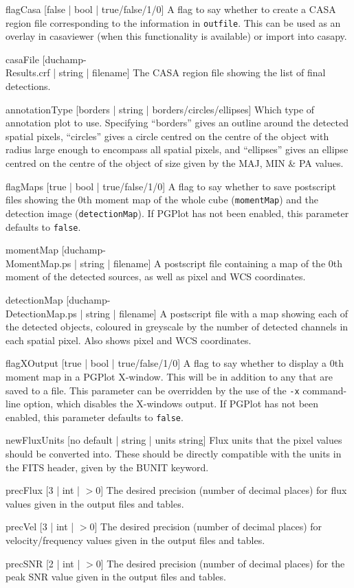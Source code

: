 \begin{Lentry}
\item[{flagCasa [false | bool | true/false/1/0]}] A flag to say
  whether to create a CASA region file corresponding to the
  information in \texttt{outfile}. This can be used as an overlay in
  casaviewer (when this functionality is available) or import into
  casapy.
\item[{casaFile [duchamp-\\Results.crf | string | filename]}] The CASA
  region file showing the list of final detections.
\item[{annotationType [borders | string | borders/circles/ellipses]}]
  Which type of annotation plot to use. Specifying ``borders'' gives
  an outline around the detected spatial pixels, ``circles'' gives a
  circle centred on the centre of the object with radius large enough
  to encompass all spatial pixels, and ``ellipses'' gives an ellipse
  centred on the centre of the object of size given by the MAJ, MIN \&
  PA values.
\item[{flagMaps [true | bool | true/false/1/0]}] A flag to say whether
  to save postscript files showing the 0th moment map of the whole
  cube (\texttt{momentMap}) and the detection image
  (\texttt{detectionMap}). If PGPlot has not been enabled, this
  parameter defaults to \texttt{false}.
\item[{momentMap [duchamp-\\MomentMap.ps | string | filename]}] A
  postscript file containing a map of the 0th moment of the detected
  sources, as well as pixel and WCS coordinates.
\item[{detectionMap [duchamp-\\DetectionMap.ps | string | filename]}]
  A postscript file with a map showing each of the detected objects,
  coloured in greyscale by the number of detected channels in each
  spatial pixel. Also shows pixel and WCS coordinates.
\item[{flagXOutput [true | bool | true/false/1/0]}] A flag to say
  whether to display a 0th moment map in a PGPlot X-window. This will
  be in addition to any that are saved to a file. This parameter can
  be overridden by the use of the \texttt{-x} command-line option,
  which disables the X-windows output. If PGPlot has not been enabled,
  this parameter defaults to \texttt{false}.
\item[{newFluxUnits [no default | string | units string]}] Flux units
  that the pixel values should be converted into. These should be
  directly compatible with the units in the FITS header, given by the
  BUNIT keyword.
\item[{precFlux [3 | int | $> 0$]}] The desired precision (\ie number
  of decimal places) for flux values given in the output files and
  tables.
\item[{precVel [3 | int | $> 0$]}] The desired precision (\ie number
  of decimal places) for velocity/frequency values given in the output
  files and tables.
\item[{precSNR [2 | int | $> 0$]}] The desired precision (\ie number
  of decimal places) for the peak SNR value given in the output files
  and tables.
\end{Lentry}


